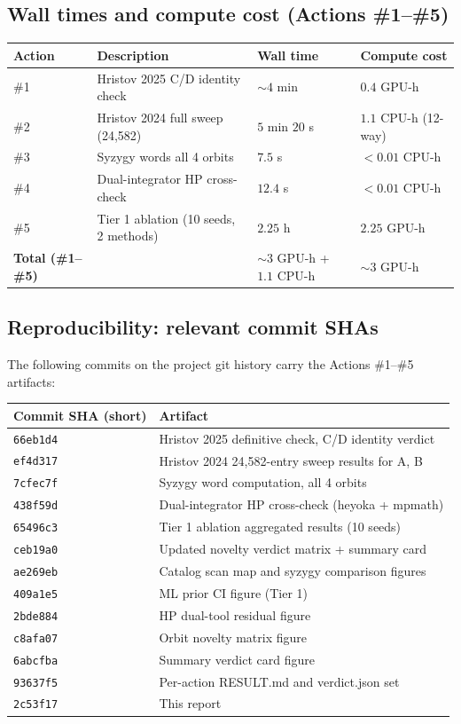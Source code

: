 \documentclass[11pt]{article}
\begin{document}
\subsection{Wall times and compute cost (Actions \#1--\#5)}

\small
\begin{tabular}{@{}llll@{}}
\toprule
Action & Description & Wall time & Compute cost \\
\midrule
\#1 & Hristov 2025 C/D identity check     & $\sim\!4$ min  & $0.4$ GPU-h \\
\#2 & Hristov 2024 full sweep (24{,}582)  & $5$ min $20$ s & $1.1$ CPU-h (12-way) \\
\#3 & Syzygy words all 4 orbits           & $7.5$ s        & $<0.01$ CPU-h \\
\#4 & Dual-integrator HP cross-check      & $12.4$ s       & $<0.01$ CPU-h \\
\#5 & Tier 1 ablation (10 seeds, 2 methods) & $2.25$ h     & $2.25$ GPU-h \\
\midrule
\textbf{Total (\#1--\#5)} & & $\sim\!3$ GPU-h + $1.1$ CPU-h & $\sim\!3$ GPU-h \\
\bottomrule
\end{tabular}
\normalsize

\subsection{Reproducibility: relevant commit SHAs}

The following commits on the project git history carry the Actions
\#1--\#5 artifacts:

\begin{tabular}{@{}ll@{}}
\toprule
Commit SHA (short) & Artifact \\
\midrule
\texttt{66eb1d4} & Hristov 2025 definitive check, C/D identity verdict \\
\texttt{ef4d317} & Hristov 2024 24{,}582-entry sweep results for A, B \\
\texttt{7cfec7f} & Syzygy word computation, all 4 orbits \\
\texttt{438f59d} & Dual-integrator HP cross-check (heyoka + mpmath) \\
\texttt{65496c3} & Tier 1 ablation aggregated results (10 seeds) \\
\texttt{ceb19a0} & Updated novelty verdict matrix + summary card \\
\texttt{ae269eb} & Catalog scan map and syzygy comparison figures \\
\texttt{409a1e5} & ML prior CI figure (Tier 1) \\
\texttt{2bde884} & HP dual-tool residual figure \\
\texttt{c8afa07} & Orbit novelty matrix figure \\
\texttt{6abcfba} & Summary verdict card figure \\
\texttt{93637f5} & Per-action RESULT.md and verdict.json set \\
\texttt{2c53f17} & This report \\
\bottomrule
\end{tabular}
\end{document}
